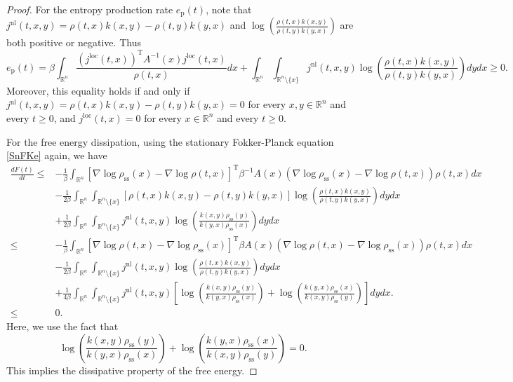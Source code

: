 \documentclass[10pt]{article}
\theoremstyle{definition}
\numberwithin{equation}{section}
\begin{document}
\begin{proof}
For the entropy production rate $e_\mathrm{p}(t)$, note that $j^\mathrm{nl}(t,x,y)= \rho(t,x)k(x,y) - \rho(t,y)k(y,x)$ and $\log \left( \frac{\rho(t,x)k(x,y)}{\rho(t,y)k(y,x)} \right)$ are both positive or negative. Thus
\begin{equation*}
    e_\mathrm{p}(t)=\beta\int_{\mathbb{R}^n} \frac{(j^\mathrm{loc}(t,x))^\mathrm{T}A^{-1}(x)j^\mathrm{loc}(t,x) }{\rho(t,x)}dx+\int_{\mathbb{R}^n}\int_{\mathbb{R}^n \setminus \{x\}} j^\mathrm{nl}(t,x,y)\log \left( \frac{\rho(t,x)k(x,y)}{\rho(t,y)k(y,x)} \right) dydx \geq 0.
\end{equation*}
Moreover, this equality holds if and only if $j^\mathrm{nl}(t,x,y)= \rho(t,x)k(x,y) - \rho(t,y)k(y,x) = 0$ for every $x,y \in \mathbb{R}^n$ and every $t \geq 0$, and $j^\mathrm{loc}(t,x) = 0$ for every $x\in \mathbb{R}^n$ and every $t \geq 0$.

For the free energy dissipation, using the stationary Fokker-Planck equation \eqref{SnFKe} again, we have
\begin{align*}
    \frac{dF(t)}{dt}
    \leq  & - \frac{1}{\beta}\int_{\mathbb{R}^n} [\nabla \log\rho_\mathrm{ss}(x) - \nabla \log\rho(t,x) ]^\mathrm{T}\beta^{-1}A(x)(\nabla \log\rho_\mathrm{ss}(x) - \nabla \log\rho(t,x) ) \rho(t,x)dx \\
    &  - \frac{1}{2\beta} \int_{\mathbb{R}^n}\int_{\mathbb{R}^n \setminus \{x\}} [\rho(t,x)k(x,y) - \rho(t,y)k(y,x)]\log \left( \frac{\rho(t,x)k(x,y)}{\rho(t,y)k(y,x)} \right) dydx  \\
    & + \frac{1}{2\beta}\int_{\mathbb{R}^n} \int_{\mathbb{R}^n \setminus \{x\}} j^\mathrm{nl}(t,x,y)\log \left( \frac{k(x,y)\rho_\mathrm{ss}(y)}{k(y,x)\rho_\mathrm{ss}(x)}\right)dy dx\\
    \leq  & - \frac{1}{\beta}\int_{\mathbb{R}^n} [\nabla \log\rho(t,x) - \nabla \log\rho_\mathrm{ss}(x) ]^\mathrm{T}\beta A(x)(\nabla \log\rho(t,x) - \nabla \log\rho_\mathrm{ss}(x) ) \rho(t,x)dx  \\
    & - \frac{1}{2\beta} \int_{\mathbb{R}^n}\int_{\mathbb{R}^n \setminus \{x\}} j^\mathrm{nl}(t,x,y) \log \left( \frac{\rho(t,x)k(x,y)}{\rho(t,y)k(y,x)} \right) dydx  \\
    & + \frac{1}{4\beta}\int_{\mathbb{R}^n} \int_{\mathbb{R}^n \setminus \{x\}} j^\mathrm{nl}(t,x,y)\left[ \log \left( \frac{k(x,y)\rho_\mathrm{ss}(y)}{k(y,x)\rho_\mathrm{ss}(x)}\right) + \log \left( \frac{k(y,x)\rho_\mathrm{ss}(x)}{k(x,y)\rho_\mathrm{ss}(y)}\right) \right]dy dx. \\
    \leq & 0.
\end{align*}
Here, we use the fact that 
\begin{equation*}
     \log \left( \frac{k(x,y)\rho_\mathrm{ss}(y)}{k(y,x)\rho_\mathrm{ss}(x)}\right) + \log \left( \frac{k(y,x)\rho_\mathrm{ss}(x)}{k(x,y)\rho_\mathrm{ss}(y)}\right) = 0.
\end{equation*}
This implies the dissipative property of the free energy.
\end{proof}
\end{document}
